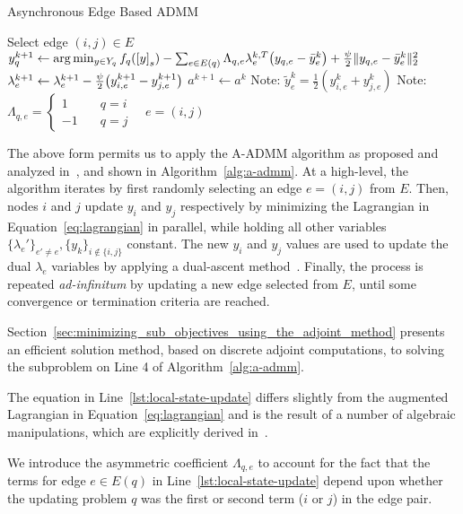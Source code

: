 \begin{algorithm}[t]  %
\caption{Asynchronous Edge Based ADMM} %
\label{alg:a-admm}       %
\begin{algorithmic}[1]%
    \STATE Select edge $\left(i,j\right) \in E$
        \STATE $y^{k+1}_q \gets \arg \min_{y \in Y_q} f_q\left(\left[y\right]_{s}\right) - \sum_{e \in E\left(q\right)} \Lambda_{q,e} \lambda^{k,T}_{e} \left(y_{q,e} - \bar{y}^{k}_{e} \right) + \frac{\augterm}{2} \|y_{q,e} - \bar{y}^{k}_{e}\|_2^2 \label{lst:local-state-update}$
        \ENDFOR
        \STATE $\lambda^{k+1}_{e} \gets \lambda^{k+1}_{e} - \frac{\augterm}{2} \left(y^{k+1}_{i,e} - y^{k+1}_{j,e}\right)$
        \STATE $a^{k+1} \gets a^{k}$
        \ENDFOR
    \ENDWHILE
    \STATE Note: $\tilde{y}^{k}_{e} = \frac{1}{2} \left(y^k_{i,e} + y^k_{j,e}\right)$
    \STATE Note: $\Lambda_{q,e} = \begin{cases} 1 & \quad q = i \\ -1 & \quad q = j \end{cases} \quad e = (i,j)$
\end{algorithmic}
\end{algorithm}
  
The above form permits us to apply the A-ADMM algorithm as proposed and analyzed in~\cite{Wei2013On}, and shown in Algorithm~\ref{alg:a-admm}. At a high-level, the algorithm iterates by first randomly selecting an edge $e = \left(i,j\right)$ from $E$. Then, nodes $i$ and $j$ update $y_i$ and $y_j$ respectively by minimizing the Lagrangian in Equation~\eqref{eq:lagrangian} in parallel, while holding all other variables $\{\lambda_e'\}_{e' \neq e}, \{y_k\}_{i\notin \{i,j\}}$ constant. The new $y_i$ and $y_j$ values are used to update the dual $\lambda_e$ variables by applying a dual-ascent method~\cite{Boyd2010a}. Finally, the process is repeated \emph{ad-infinitum} by updating a new edge selected from $E$, until some convergence or termination criteria are reached.

Section~\ref{sec:minimizing_sub_objectives_using_the_adjoint_method} presents an efficient solution method, based on discrete adjoint computations, to solving the subproblem on Line 4 of Algorithm~\ref{alg:a-admm}.

\begin{remark} The equation in Line~\ref{lst:local-state-update} differs slightly from the augmented Lagrangian in Equation~\eqref{eq:lagrangian} and is the result of a number of algebraic manipulations, which are explicitly derived in~\cite{Boyd2010a,Wei2013On}.
\end{remark}
\begin{remark}
We introduce the asymmetric coefficient $\Lambda_{q,e}$ to account for the fact that the terms for edge $e\in E\left(q\right)$ in Line~\ref{lst:local-state-update} depend upon whether the updating problem $q$ was the first or second term ($i$ or $j$) in the edge pair.
\end{remark}


